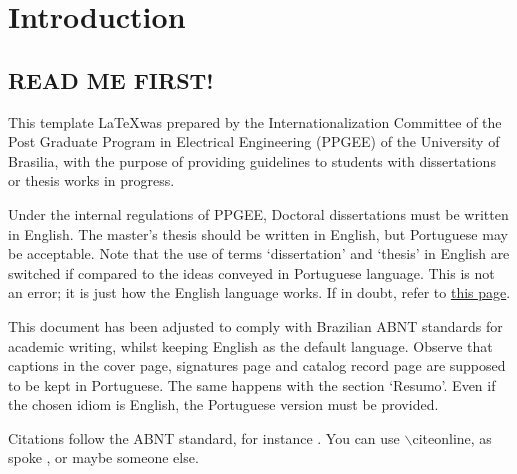 
\chapter{Introduction}\label{Cap:Introduction}
	
	\section{READ ME FIRST!}
	This template \LaTeX was prepared by the Internationalization Committee of the Post Graduate Program in Electrical Engineering (PPGEE) of the University of Brasilia, with the purpose of providing guidelines to students with dissertations or thesis works in progress.
	
	Under the internal regulations of PPGEE, Doctoral dissertations must be written in English. The master's thesis should be written in English, but Portuguese may be acceptable. Note that the use of terms `dissertation' and `thesis' in English are switched if compared to the ideas conveyed in Portuguese language. This is not an error; it is just how the English language works. If in doubt, refer to \href{https://www.enago.com/academy/thesis-vs-dissertation/}{this page}.
	
	This document has been adjusted to comply with Brazilian ABNT standards for academic writing, whilst keeping English as the default language. Observe that captions in the cover page, signatures page and catalog record page are supposed to be kept in Portuguese. The same happens with the section `Resumo'. Even if the chosen idiom is English, the Portuguese version must be provided.
	
	Citations follow the ABNT standard, for instance \cite{Saadat1999,ABNT1993}. You can use $\backslash$citeonline, as spoke , or maybe someone else.
	
